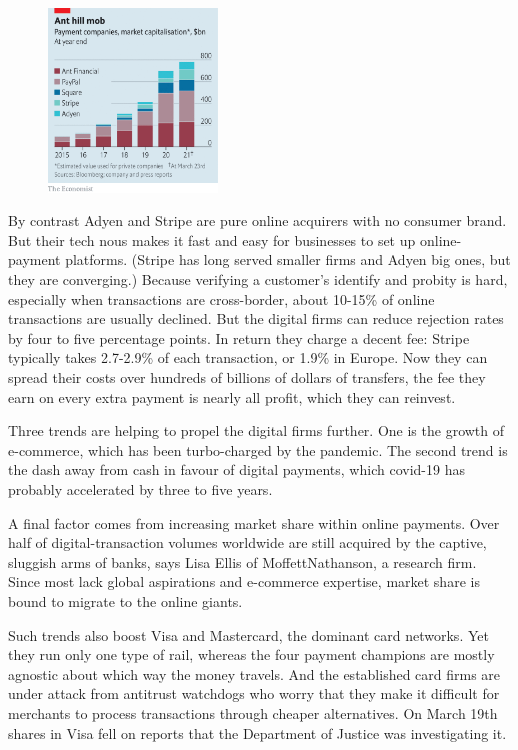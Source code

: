 \documentclass{article}
\begin{document}
\begin{figure}[h]
\centering
\includegraphics[width=0.4\textwidth]{images/20210327_fnc309.png}
\end{figure}


By contrast Adyen and Stripe are pure online acquirers with no consumer brand. But their tech nous makes it fast and easy for businesses to set up online-payment platforms. (Stripe has long served smaller firms and Adyen big ones, but they are converging.) Because verifying a customer's identify and probity is hard, especially when transactions are cross-border, about 10-15\% of online transactions are usually declined. But the digital firms can reduce rejection rates by four to five percentage points. In return they charge a decent fee: Stripe typically takes 2.7-2.9\% of each transaction, or 1.9\% in Europe. Now they can spread their costs over hundreds of billions of dollars of transfers, the fee they earn on every extra payment is nearly all profit, which they can reinvest. 

Three trends are helping to propel the digital firms further. One is the growth of e-commerce, which has been turbo-charged by the pandemic. The second trend is the dash away from cash in favour of digital payments, which covid-19 has probably accelerated by three to five years. 

A final factor comes from increasing market share within online payments. Over half of digital-transaction volumes worldwide are still acquired by the captive, sluggish arms of banks, says Lisa Ellis of MoffettNathanson, a research firm. Since most lack global aspirations and e-commerce expertise, market share is bound to migrate to the online giants. 

Such trends also boost Visa and Mastercard, the dominant card networks. Yet they run only one type of rail, whereas the four payment champions are mostly agnostic about which way the money travels. And the established card firms are under attack from antitrust watchdogs who worry that they make it difficult for merchants to process transactions through cheaper alternatives. On March 19th shares in Visa fell on reports that the Department of Justice was investigating it. 
\end{document}
